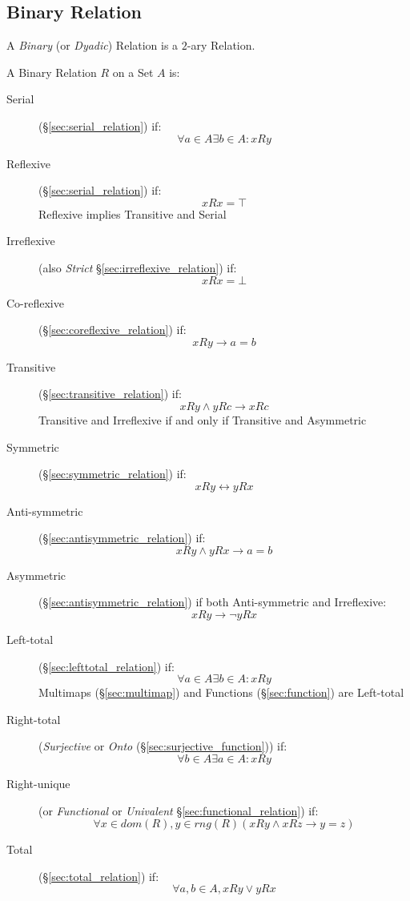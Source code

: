 \subsection{Binary Relation}\label{sec:binary_relation}

A \emph{Binary} (or \emph{Dyadic}) Relation is a $2$-ary Relation.

A Binary Relation $R$ on a Set $A$ is:
\begin{description}
\item[Serial](\S\ref{sec:serial_relation}) if:
  \[
    \forall a \in A \exists b \in A : xRy
  \]
\item[Reflexive](\S\ref{sec:serial_relation}) if:
  \[
    xRx = \top
  \]
  Reflexive implies Transitive and Serial
\item[Irreflexive] (also \emph{Strict}
  \S\ref{sec:irreflexive_relation}) if:
  \[
    xRx = \bot
  \]
\item[Co-reflexive](\S\ref{sec:coreflexive_relation}) if:
  \[
    xRy \rightarrow a = b
  \]
\item[Transitive](\S\ref{sec:transitive_relation}) if:
  \[
    xRy \wedge yRc \rightarrow xRc
  \]
  Transitive and Irreflexive if and only if Transitive and Asymmetric
\item[Symmetric](\S\ref{sec:symmetric_relation}) if:
  \[
    xRy \leftrightarrow yRx
  \]
\item[Anti-symmetric](\S\ref{sec:antisymmetric_relation}) if:
  \[
    xRy \wedge yRx \rightarrow a = b
  \]
\item[Asymmetric](\S\ref{sec:antisymmetric_relation}) if both
  Anti-symmetric and Irreflexive:
  \[
    xRy \rightarrow \neg yRx
  \]
\item[Left-total] (\S\ref{sec:lefttotal_relation}) if:
  \[
    \forall a \in A \exists b \in A : xRy
  \]
  Multimaps (\S\ref{sec:multimap}) and Functions
  (\S\ref{sec:function}) are Left-total
\item[Right-total] (\emph{Surjective} or \emph{Onto}
  (\S\ref{sec:surjective_function})) if:
  \[
    \forall b \in A \exists a \in A : xRy
  \]
\item[Right-unique] (or \emph{Functional} or \emph{Univalent}
  \S\ref{sec:functional_relation}) if:
  \[
    \forall x \in dom(R), y \in rng(R)
    (xRy \wedge xRz \rightarrow y = z)
  \]
\item[Total] (\S\ref{sec:total_relation}) if:
  \[
    \forall a,b \in A, xRy \vee yRx
\]
\end{description}
